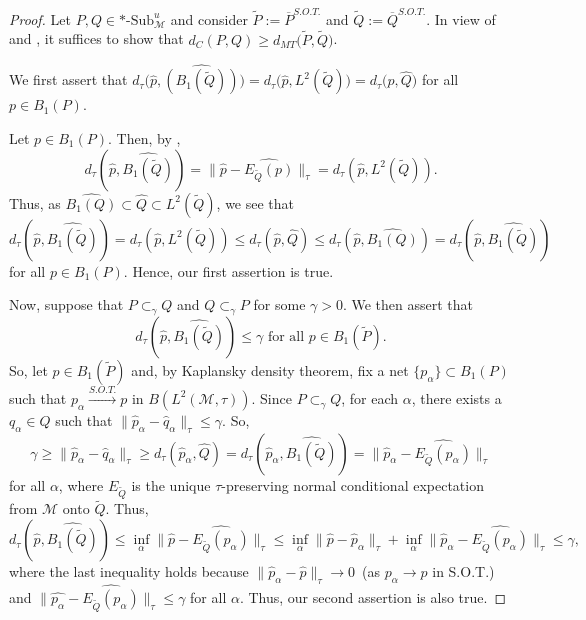 \documentclass{amsart}
\numberwithin{equation}{section}
\newcommand{\1}{\mathbf{1}}
\newcommand{\mM}{\mathcal{M}}
\begin{document}
\begin{proof}
  Let $P, Q \in *\text{-}\mathrm{Sub}_{\mM}^u$ and consider
  $\widetilde{P}:= \overline{P}^{S.O.T.}$ and $\widetilde{Q}:=
  \overline{Q}^{S.O.T.}$.  In view of  and
  , it suffices to show that $d_C(P, Q) \geq
  d_{MT}\big(\widetilde{P}, \widetilde{Q}\big)$.

We first assert that  $d_\tau \Big(\widehat{p},
\widehat{(B_1(\widetilde{Q}))}\Big)= d_\tau \Big(\widehat{p},
L^{2}(\widetilde{Q})\Big)= d_\tau \Big(\widehat{p}, \widehat{Q}\Big)$ for all $p \in
B_1(P)$.

Let $p \in B_1(P)$. Then,  by , 
\[
d_\tau \left(\widehat{p}, \widehat{B_1(\widetilde{Q})}\right)= \| \widehat{p} - \widehat{E_{\widetilde{Q}}(p)}\|_\tau = d_\tau \left(\widehat{p},
L^{2}(\widetilde{Q})\right).
\]
Thus, as $\widehat{B_1(Q)}\subset \widehat{Q} \subset
L^2(\widetilde{Q})$, we see that
\[
d_\tau \left(\widehat{p}, \widehat{B_1(\widetilde{Q})}\right)=
d_\tau \left(\widehat{p}, L^{2}(\widetilde{Q})\right)\leq
d_\tau \left(\widehat{p}, \widehat{Q}\right) \leq d_\tau \left(\widehat{p},
\widehat{B_1(Q)}\right)= d_\tau \left(\widehat{p},
\widehat{B_1(\widetilde{Q})}\right)
\]
for all $p \in B_1(P)$. Hence, our first assertion is true.


Now, suppose that $P\subset_{\gamma} Q$ and $Q\subset_{\gamma} P$ for
some $\gamma > 0$. We then assert that
\[
d_\tau \left(\widehat{p}, \widehat{B_1(\widetilde{Q})}\right) \leq \gamma
\text{ for all } p\in B_1(\widetilde{P}).
\]
So, let $p\in B_1(\widetilde{P})$ and,  by Kaplansky density theorem, fix
a net $\{p_{\alpha}\}\subset B_1(P)$ such that
$p_{\alpha}\stackrel{S.O.T.}{\longrightarrow} p$ in $B(L^2(\mM,
\tau))$. Since $P \subset_\gamma Q$, for each
$\alpha$, there exists a $ q_{\alpha}\in Q$ such that $\|\widehat{p}_{\alpha}-
\widehat{q}_{\alpha}\|_{\tau}\leq \gamma.$ So,
\[
\gamma \geq \|\widehat{p}_{\alpha}- \widehat{q}_{\alpha}\|_{\tau}\geq d_\tau
(\widehat{p}_{\alpha}, \widehat{Q})= d_\tau \left(\widehat{p}_{\alpha},
\widehat{B_1(\widetilde{Q})}\right)= \|\widehat{p}_{\alpha}-
\widehat{E_{\widetilde{Q}}(p_{\alpha})} \|_{\tau}
\]
for all $\alpha$, where $E_{\widetilde{Q}}$ is the unique $\tau$-preserving normal
conditional expectation from $\mM$ onto $\widetilde{Q}$.
Thus, 
\[
d_\tau \left(\widehat{p}, \widehat{B_1(\widetilde{Q})}\right)  \leq  \inf_{\alpha} \|\widehat{p}- \widehat{E_{\widetilde{Q}}(p_{\alpha})} \|_{\tau}
 \leq  \inf_{\alpha}\| \widehat{p} - \widehat{p}_{\alpha}\|_{\tau}+ \inf_{\alpha}\|\widehat{p}_{\alpha}- \widehat{E_{\widetilde{Q}}(p_{\alpha})} \|_{\tau}
 \leq  \gamma,
\]
where the last inequality holds because $\|\widehat{p}_{\alpha}-
\widehat{p}\|_{\tau} \rightarrow 0\,$ (as $p_{\alpha} \rightarrow p$ in
S.O.T.) and  $\| \widehat{p_{\alpha}} -
\widehat{E_{\widetilde{Q}}(p_{\alpha})}\|_\tau \leq \gamma$ for all
$\alpha$. Thus, our second assertion is also true.


\end{proof}
\end{document}
